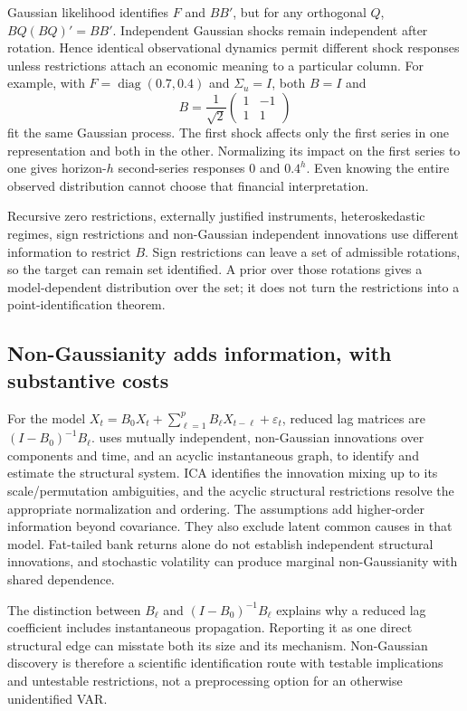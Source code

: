 Gaussian likelihood identifies $F$ and $BB'$, but for any orthogonal
$Q$, $BQ(BQ)'=BB'$. Independent Gaussian shocks remain independent
after rotation. Hence identical observational dynamics permit
different shock responses unless restrictions attach an economic
meaning to a particular column. For example, with
$F=\operatorname{diag}(0.7,0.4)$ and $\Sigma_u=I$, both $B=I$
and
\[
 B=\frac1{\sqrt2}\begin{pmatrix}1&-1\\1&1\end{pmatrix}
\]
fit the same Gaussian process. The first shock affects only the first
series in one representation and both in the other. Normalizing its
impact on the first series to one gives horizon-$h$ second-series
responses $0$ and $0.4^h$. Even knowing the entire observed
distribution cannot choose that financial interpretation.

Recursive zero restrictions, externally justified instruments,
heteroskedastic regimes, sign restrictions and non-Gaussian independent
innovations use different information to restrict $B$. Sign restrictions
can leave a set of admissible rotations, so the target can remain set
identified. A prior over those rotations gives a model-dependent
distribution over the set; it does not turn the restrictions into a
point-identification theorem.

\subsection{Non-Gaussianity adds information, with substantive costs}
For the model
$X_t=B_0X_t+\sum_{\ell=1}^pB_\ell X_{t-\ell}+\varepsilon_t$,
reduced lag matrices are $(I-B_0)^{-1}B_\ell$.
\citet[Sections 2 and 5]{hyvarinen2010} uses mutually independent,
non-Gaussian innovations over components and time, and an acyclic
instantaneous graph, to identify and estimate the structural system.
ICA identifies the innovation mixing up to its scale/permutation
ambiguities, and the acyclic structural restrictions resolve the
appropriate normalization and ordering. The assumptions add higher-order
information beyond covariance. They also exclude latent common causes
in that model. Fat-tailed bank returns alone do not establish
independent structural innovations, and stochastic volatility can
produce marginal non-Gaussianity with shared dependence.

The distinction between $B_\ell$ and $(I-B_0)^{-1}B_\ell$ explains
why a reduced lag coefficient includes instantaneous propagation.
Reporting it as one direct structural edge can misstate both its
size and its mechanism. Non-Gaussian discovery is therefore a
scientific identification route with testable implications and
untestable restrictions, not a preprocessing option for an otherwise
unidentified VAR.

